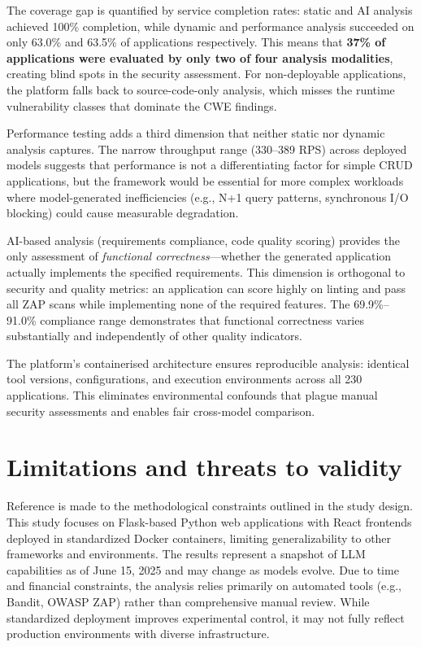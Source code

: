The coverage gap is quantified by service completion rates: static and AI analysis achieved 100\% completion, while dynamic and performance analysis succeeded on only 63.0\% and 63.5\% of applications respectively. This means that \textbf{37\% of applications were evaluated by only two of four analysis modalities}, creating blind spots in the security assessment. For non-deployable applications, the platform falls back to source-code-only analysis, which misses the runtime vulnerability classes that dominate the CWE findings.

Performance testing adds a third dimension that neither static nor dynamic analysis captures. The narrow throughput range (330--389 RPS) across deployed models suggests that performance is not a differentiating factor for simple CRUD applications, but the framework would be essential for more complex workloads where model-generated inefficiencies (e.g., N+1 query patterns, synchronous I/O blocking) could cause measurable degradation.

AI-based analysis (requirements compliance, code quality scoring) provides the only assessment of \textit{functional correctness}---whether the generated application actually implements the specified requirements. This dimension is orthogonal to security and quality metrics: an application can score highly on linting and pass all ZAP scans while implementing none of the required features. The 69.9\%--91.0\% compliance range demonstrates that functional correctness varies substantially and independently of other quality indicators.

The platform's containerised architecture ensures reproducible analysis: identical tool versions, configurations, and execution environments across all 230 applications. This eliminates environmental confounds that plague manual security assessments and enables fair cross-model comparison.

\section{Limitations and threats to validity}
\label{sec:limitations}

Reference is made to the methodological constraints outlined in the study design. This study focuses on Flask-based Python web applications with React frontends deployed in standardized Docker containers, limiting generalizability to other frameworks and environments. The results represent a snapshot of LLM capabilities as of June 15, 2025 and may change as models evolve. Due to time and financial constraints, the analysis relies primarily on automated tools (e.g., Bandit, OWASP ZAP) rather than comprehensive manual review. While standardized deployment improves experimental control, it may not fully reflect production environments with diverse infrastructure.

